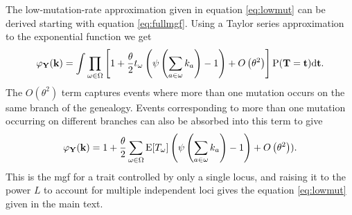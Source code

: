 The low-mutation-rate approximation given in equation \eqref{eq:lowmut} can be
derived starting with equation \eqref{eq:fullmgf}. Using a Taylor series
approximation to the exponential function we get
\begin{equation}
  \varphi_{\mathbf{Y}}(\mathbf{k}) =   \int \prod_{\omega \in \Omega}
  \left[1 + \frac{\theta}{2} t_{\omega} \left( \psi\left(\sum_{a \in \omega}k_{a}\right) -1 \right) +
    O\left( \theta^2 \right)\right]
  \mathrm{P}(\mathbf{T}=\mathbf{t})\mbox{d}\mathbf{t}.
\end{equation}
The $O\left( \theta^2 \right)$ term captures events where more than one mutation
occurs on the same branch of the genealogy. Events corresponding to more than
one mutation occurring on different branches can also be absorbed into this term
to give
\begin{equation}
  \label{eq:lowmutder}
  \varphi_{\mathbf{Y}}(\mathbf{k}) =
  1 + \frac{\theta}{2} \sum_{\omega \in \Omega}
  \mathrm{E}[T_\omega] \left( \psi\left( \sum_{a \in \omega} k_a\right) -1 \right) +
  O\left( \theta^2 \right)).
\end{equation}
This is the mgf for a trait controlled by only a single locus, and raising it to
the power $L$ to account for multiple independent loci gives the equation
\eqref{eq:lowmut} given in the main text. 

